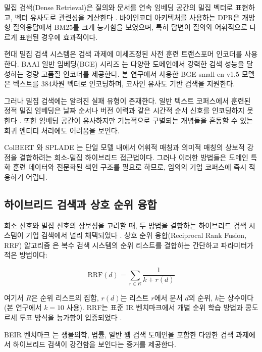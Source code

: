 밀집 검색(Dense Retrieval)은 질의와 문서를 연속 임베딩 공간의 밀집 벡터로 표현하고, 벡터 유사도로 관련성을 계산한다 \citep{karpukhin2020dpr}. 바이인코더 아키텍처를 사용하는 DPR은 개방형 질의응답에서 BM25를 크게 능가함을 보였으며, 특히 답변이 질의와 어휘적으로 다르게 표현된 경우에 효과적이다.

현대 밀집 검색 시스템은 검색 과제에 미세조정된 사전 훈련 트랜스포머 인코더를 사용한다. BAAI 일반 임베딩(BGE) 시리즈 \citep{xiao2023bge}는 다양한 도메인에서 강력한 검색 성능을 달성하는 경량 고품질 인코더를 제공한다. 본 연구에서 사용한 BGE-small-en-v1.5 모델은 텍스트를 384차원 벡터로 인코딩하며, 코사인 유사도 기반 검색을 지원한다.

그러나 밀집 검색에는 알려진 실패 유형이 존재한다. 일반 텍스트 코퍼스에서 훈련된 정적 밀집 임베딩은 날짜 순서나 버전 이력과 같은 시간적 순서 신호를 인코딩하지 못한다 \citep{manning2008ir}. 또한 임베딩 공간이 유사하지만 기능적으로 구별되는 개념들을 혼동할 수 있는 희귀 엔티티 처리에도 어려움을 보인다.

ColBERT \citep{khattab2020colbert}와 SPLADE \citep{formal2021splade}는 단일 모델 내에서 어휘적 매칭과 의미적 매칭의 상보적 강점을 결합하려는 희소-밀집 하이브리드 접근법이다. 그러나 이러한 방법들은 도메인 특화 훈련 데이터와 전문화된 색인 구조를 필요로 하므로, 임의의 기업 코퍼스에 즉시 적용하기 어렵다.

\subsection{하이브리드 검색과 상호 순위 융합}

희소 신호와 밀집 신호의 상보성을 고려할 때, 두 방법을 결합하는 하이브리드 검색 시스템이 기업 검색에서 널리 채택되었다 \citep{luan2021sparse_dense}. 상호 순위 융합(Reciprocal Rank Fusion, RRF) 알고리즘 \citep{cormack2009rrf}은 복수 검색 시스템의 순위 리스트를 결합하는 간단하고 파라미터가 적은 방법이다:

\begin{equation}
    \text{RRF}(d) = \sum_{r \in R} \frac{1}{k + r(d)}
    \label{eq:rrf_ko}
\end{equation}

여기서 $R$은 순위 리스트의 집합, $r(d)$는 리스트 $r$에서 문서 $d$의 순위, $k$는 상수이다(본 연구에서 $k=10$ 사용). RRF는 표준 IR 벤치마크에서 개별 순위 학습 방법과 콩도르세 투표 방식을 능가함이 입증되었다 \citep{cormack2009rrf}.

BEIR 벤치마크 \citep{thakur2021beir}는 생물의학, 법률, 일반 웹 검색 도메인을 포함한 다양한 검색 과제에서 하이브리드 검색이 강건함을 보인다는 증거를 제공한다.

